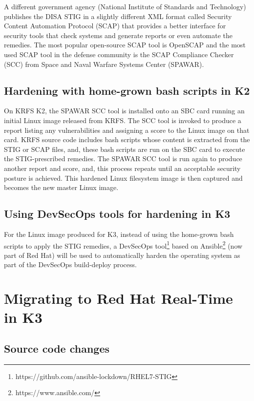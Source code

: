 \documentclass[12pt]{article}
\begin{document}
A different government agency (National Institute of Standards and Technology)
publishes the DISA STIG in a slightly different XML format called Security
Content Automation Protocol (SCAP) that provides a better interface for security
tools that check systems and generate reports or even automate the remedies.
The most popular open-source SCAP tool is OpenSCAP and the most used SCAP tool
in the defense community is the SCAP Compliance Checker (SCC) from Space and
Naval Warfare Systems Center (SPAWAR).

\subsection{Hardening with home-grown bash scripts in K2}
On KRFS K2, the SPAWAR SCC tool is installed onto an SBC card running an initial
Linux image released from KRFS.  The SCC tool is invoked to produce a report
listing any vulnerabilities and assigning a score to the Linux image on that
card.  KRFS source code includes bash scripts whose content is extracted from
the STIG or SCAP files, and, these bash scripts are run on the SBC card to
execute the STIG-prescribed remedies.  The SPAWAR SCC tool is run again to
produce another report and score, and, this process repeats until an acceptable
security posture is achieved.  This hardened Linux filesystem image is then
captured and becomes the new master Linux image.

\subsection{Using DevSecOps tools for hardening in K3}
For the Linux image produced for K3, instead of using the home-grown bash
scripts to apply the STIG remedies, a DevSecOps
tool\footnote{https://github.com/ansible-lockdown/RHEL7-STIG} based on
Ansible\footnote{https://www.ansible.com/} (now part of Red Hat) will be used to
automatically harden the operating system as part of the DevSecOps build-deploy
process.

%
\newpage
\section{Migrating to Red Hat Real-Time in K3}
\label{sec:redhat_migration}

\subsection{Source code changes}
\end{document}
